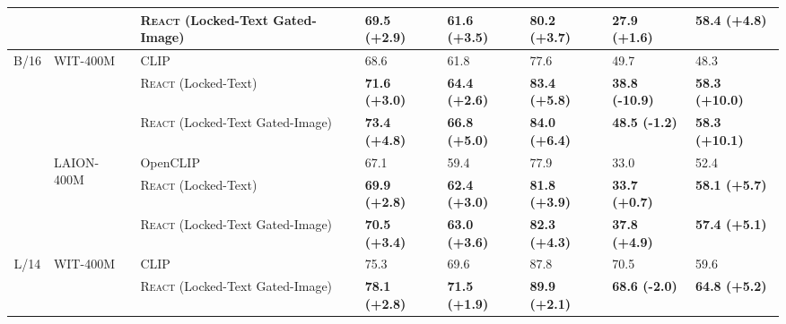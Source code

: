 \documentclass[10pt,twocolumn,letterpaper]{article}
\newcommand{\shortname}{\textsc{React}}
\begin{document}
\begin{table*}[t]
{\begin{tabular}{c|l|l|lllll}
 &  & \shortname{} (Locked-Text Gated-Image) & {\bf\cellcolor{Gray}69.5 \textcolor{emerald!80}{(+2.9)}} & {\bf\cellcolor{Gray}61.6 \textcolor{emerald!80}{(+3.5)}} & {\bf\cellcolor{Gray}80.2 \textcolor{emerald!80}{(+3.7)}} & {\bf\cellcolor{Gray}27.9 \textcolor{emerald!80}{(+1.6)}} & {\bf\cellcolor{Gray}58.4 \textcolor{emerald!80}{(+4.8)}} \\
\midrule
\multirow{6.5}{*}{B/16} & \multirow{3}{*}{WIT-400M} & CLIP & 68.6 & 61.8 & 77.6 & 49.7 & 48.3 \\
 &  & \shortname{} (Locked-Text) & {\bf\cellcolor{Gray}71.6 \textcolor{emerald!80}{(+3.0)}} & {\bf\cellcolor{Gray}64.4 \textcolor{emerald!80}{(+2.6)}} & {\bf\cellcolor{Gray}83.4 \textcolor{emerald!80}{(+5.8)}} & {\bf\cellcolor{Gray}38.8 \textcolor{coralred!80}{(-10.9)}} & {\bf\cellcolor{Gray}58.3 \textcolor{emerald!80}{(+10.0)}} \\
 &  & \shortname{} (Locked-Text Gated-Image) & {\bf\cellcolor{Gray}73.4 \textcolor{emerald!80}{(+4.8)}} & {\bf\cellcolor{Gray}66.8 \textcolor{emerald!80}{(+5.0)}} & {\bf\cellcolor{Gray}84.0 \textcolor{emerald!80}{(+6.4)}} & {\bf\cellcolor{Gray}48.5 \textcolor{coralred!80}{(-1.2)}} & {\bf\cellcolor{Gray}58.3 \textcolor{emerald!80}{(+10.1)}} \\
 \cmidrule{2-8}
 & \multirow{3}{*}{LAION-400M} & OpenCLIP & 67.1 & 59.4 & 77.9 & 33.0 & 52.4 \\
 &  & \shortname{} (Locked-Text) & {\bf\cellcolor{Gray}69.9 \textcolor{emerald!80}{(+2.8)}} & {\bf\cellcolor{Gray}62.4 \textcolor{emerald!80}{(+3.0)}} & {\bf\cellcolor{Gray}81.8 \textcolor{emerald!80}{(+3.9)}} & {\bf\cellcolor{Gray}33.7 \textcolor{emerald!80}{(+0.7)}} & {\bf\cellcolor{Gray}58.1 \textcolor{emerald!80}{(+5.7)}} \\
 &  & \shortname{} (Locked-Text Gated-Image) & {\bf\cellcolor{Gray}70.5 \textcolor{emerald!80}{(+3.4)}} & {\bf\cellcolor{Gray}63.0 \textcolor{emerald!80}{(+3.6)}} & {\bf\cellcolor{Gray}82.3 \textcolor{emerald!80}{(+4.3)}} & {\bf\cellcolor{Gray}37.8 \textcolor{emerald!80}{(+4.9)}} & {\bf\cellcolor{Gray}57.4 \textcolor{emerald!80}{(+5.1)}} \\
\midrule
\multirow{4.5}{*}{L/14} & \multirow{2}{*}{WIT-400M} & CLIP & 75.3 & 69.6 & 87.8 & 70.5 & 59.6 \\
 &  & \shortname{} (Locked-Text Gated-Image) & {\bf\cellcolor{Gray}78.1 \textcolor{emerald!80}{(+2.8)}} & {\bf\cellcolor{Gray}71.5 \textcolor{emerald!80}{(+1.9)}} & {\bf\cellcolor{Gray}89.9 \textcolor{emerald!80}{(+2.1)}} & {\bf\cellcolor{Gray}68.6 \textcolor{coralred!80}{(-2.0)}} & {\bf\cellcolor{Gray}64.8 \textcolor{emerald!80}{(+5.2)}} \\

\end{tabular}}
\end{table*}
\end{document}
